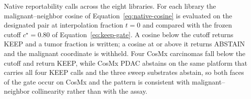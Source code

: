 Native reportability calls across the eight libraries. For each library the malignant--neighbor cosine of Equation~\eqref{eq:native-cosine} is evaluated on the designated pair at interpolation fraction \(t=0\) and compared with the frozen cutoff \(c^\star=0.80\) of Equation~\eqref{eq:keep-gate}. A cosine below the cutoff returns KEEP and a tumor fraction is written; a cosine at or above it returns ABSTAIN and the malignant coordinate is withheld. Four CosMx carcinomas fall below the cutoff and return KEEP, while CosMx PDAC abstains on the same platform that carries all four KEEP calls and the three sweep substrates abstain, so both faces of the gate occur on CosMx and the pattern is consistent with malignant--neighbor collinearity rather than with the assay.
